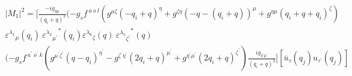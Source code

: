\begin{equation}
\begin{split}
|M_1|^2=[\frac{-ig_{{\eta}{\mu}}}{(q_i +q)^2}(-g_s f^{\:a\:o\:l}(g^{{\mu}{\zeta}}(-q_i +q)^{\eta}+g^{{\zeta}{\eta}}(-q-(q_i +q))^{\mu}+g^{{\eta}{\mu}}(q_i +q+q_i)^{\zeta})\\
{\varepsilon^{\lambda_1}}_{\mu} (q_i)\:{{\varepsilon^{\lambda_2}}_{{\mu}^{\prime}}}^* (q_i) {\varepsilon^{\lambda_6}}_{\zeta} (q)\:{{\varepsilon^{\lambda_5}}_{{\zeta}^{\prime}}}^* (q)\\
(-g_s f^{\:a^{\prime}\:o^{\prime}\:k}(g^{{{\mu}^{\prime}}{{\zeta}^{\prime}}}(q-q_i)^{{\eta}^{\prime}}-g^{{{\zeta}^{\prime}}{{\eta}^{\prime}}}(2q_i +q)^{{\mu}^{\prime}}+g^{{{\eta}^{\prime}}{{\mu}^{\prime}}}(2q_i +q)^{{\zeta}^{\prime}})\frac{ig_{{{\eta}^{\prime}}{{\mu}^{\prime}}}}{(q_i +q)^2}][\bar{u}_{\tau}(q_j){u}_{{\tau}^{\prime}}(q_j)]
\end{split}
\end{equation}


